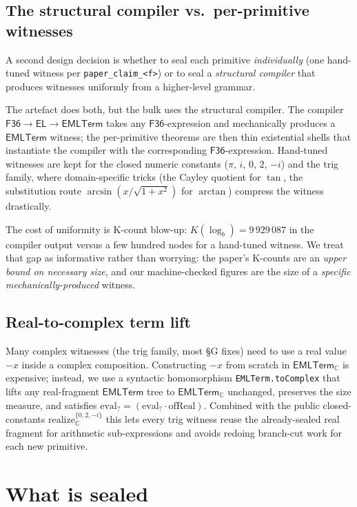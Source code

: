 \documentclass[11pt,a4paper]{article}
\theoremstyle{plain}
\theoremstyle{definition}
\newcommand{\C}{\mathbb{C}}
\newcommand{\EMLT}{\mathsf{EMLTerm}}
\newcommand{\EMLTC}{\mathsf{EMLTerm}_\C}
\newcommand{\F}{\mathsf{F36}}
\newcommand{\EL}{\mathsf{EL}}
\begin{document}
\subsection{The structural compiler vs.~per-primitive witnesses}

A second design decision is whether to seal each primitive
\emph{individually} (one hand-tuned witness per
\texttt{paper\_claim\_<f>}) or to seal a \emph{structural compiler}
that produces witnesses uniformly from a higher-level grammar.

The artefact does both, but the bulk uses the structural compiler.
The compiler $\F \to \EL \to \EMLT$ takes any $\F$-expression and
mechanically produces a $\EMLT$ witness; the per-primitive theorems
are then thin existential shells that instantiate the compiler with
the corresponding $\F$-expression. Hand-tuned witnesses are kept for
the closed numeric constants ($\pi$, $i$, $0$, $2$, $-i$) and the
trig family, where domain-specific tricks (the Cayley quotient for
$\tan$, the substitution route $\arcsin(x/\sqrt{1+x^2})$ for
$\arctan$) compress the witness drastically.

The cost of uniformity is K-count blow-up: $K(\log_b) = 9\,929\,087$
in the compiler output versus a few hundred nodes for a hand-tuned
witness. We treat that gap as informative rather than worrying:
the paper's K-counts are an \emph{upper bound on necessary size}, and
our machine-checked figures are the size of a \emph{specific
mechanically-produced} witness.

\subsection{Real-to-complex term lift}\label{sec:realcomplex}

Many complex witnesses (the trig family, most §G fixes) need to use a
real value $-x$ inside a complex composition. Constructing $-x$ from
scratch in $\EMLTC$ is expensive; instead, we use a syntactic
homomorphism \texttt{EMLTerm.toComplex} that lifts any real-fragment
$\EMLT$ tree to $\EMLTC$ unchanged, preserves the size measure, and
satisfies $\mathrm{eval}_? = (\mathrm{eval}_? \cdot \mathrm{ofReal})$.
Combined with the public closed-constants
$\mathrm{realize}_\C^{\{0, 2, -i\}}$
this lets every trig witness reuse the already-sealed real fragment
for arithmetic sub-expressions and avoids redoing branch-cut work for
each new primitive.

\section{What is sealed}\label{sec:sealed}
\end{document}
